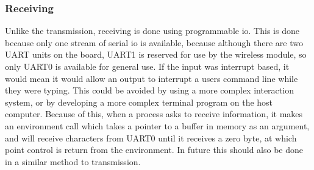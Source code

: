 \subsubsection{Receiving}
Unlike the transmission, receiving is done using programmable \ac{io}. This is done because only one stream of serial \ac{io} is available, because although there are two UART units on the board, UART1 is reserved for use by the wireless module, so only UART0 is available for general use. If the input was interrupt based, it would mean it would allow an output to interrupt a users command line while they were typing. This could be avoided by using a more complex interaction system, or by developing a more complex terminal program on the host computer. Because of this, when a process asks to receive information, it makes an environment call which takes a pointer to a buffer in memory as an argument, and will receive characters from UART0 until it receives a zero byte, at which point control is return from the environment. In future this should also be done in a similar method to transmission.
